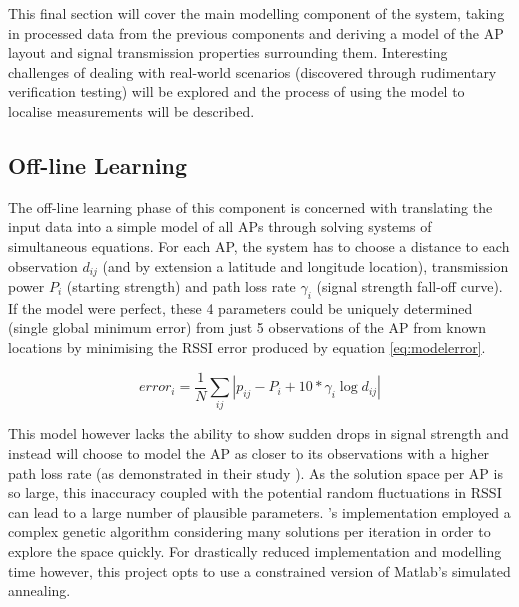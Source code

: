 \documentclass{UoYCSproject}
\begin{document}
            This final section will cover the main modelling component of the system, taking in processed data from the previous components and deriving a model of the AP layout and signal transmission properties surrounding them. Interesting challenges of dealing with real-world scenarios (discovered through rudimentary verification testing) will be explored and the process of using the model to localise measurements will be described.
        
            \subsection{Off-line Learning}
            
                The off-line learning phase of this component is concerned with translating the input data into a simple model of all APs through solving systems of simultaneous equations. For each AP, the system has to choose a distance to each observation $d_{ij}$ (and by extension a latitude and longitude location), transmission power $P_i$ (starting strength) and path loss rate $\gamma_i$ (signal strength fall-off curve). If the model were perfect, these 4 parameters could be uniquely determined (single global minimum error) from just 5 observations of the AP from known locations by minimising the RSSI error produced by equation \ref{eq:modelerror}.
                
                \begin{equation}
                \label{eq:modelerror}
                    error_i = \frac{1}{N}\sum_{ij}|p_{ij} - P_i + 10*\gamma_i\log{d_{ij}}|
                \end{equation}
                
                This model however lacks the ability to show sudden drops in signal strength and instead will choose to model the AP as closer to its observations with a higher path loss rate (as demonstrated in their study \citep{chintalapudi2010indoor}). As the solution space per AP is so large, this inaccuracy coupled with the potential random fluctuations in RSSI can lead to a large number of plausible parameters. \citeauthor{chintalapudi2010indoor}'s implementation employed a complex genetic algorithm considering many solutions per iteration in order to explore the space quickly. For drastically reduced implementation and modelling time however, this project opts to use a constrained version of Matlab's simulated annealing.
                
\end{document}

